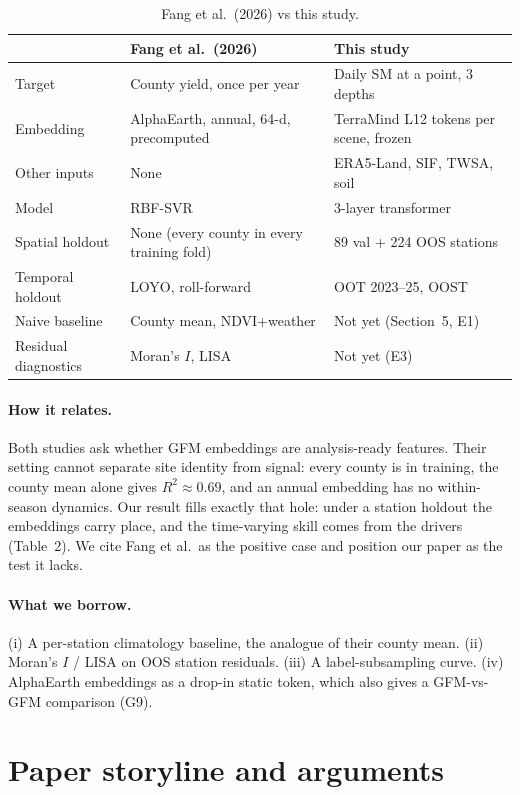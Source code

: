 \documentclass[11pt,a4paper]{article}
\begin{document}
\begin{table}[h]
\centering\small
\caption{Fang et al.\ (2026) vs this study.}
\begin{tabularx}{\linewidth}{@{}l Y Y@{}}
\toprule
 & Fang et al.\ (2026) & This study \\
\midrule
Target & County yield, once per year & Daily SM at a point, 3 depths \\
Embedding & AlphaEarth, annual, 64-d, precomputed & TerraMind L12 tokens per scene, frozen \\
Other inputs & None & ERA5-Land, SIF, TWSA, soil \\
Model & RBF-SVR & 3-layer transformer \\
Spatial holdout & None (every county in every training fold) & 89 val + 224 OOS stations \\
Temporal holdout & LOYO, roll-forward & OOT 2023--25, OOST \\
Naive baseline & County mean, NDVI+weather & Not yet (Section~5, E1) \\
Residual diagnostics & Moran's $I$, LISA & Not yet (E3) \\
\bottomrule
\end{tabularx}
\end{table}

\paragraph{How it relates.} Both studies ask whether GFM embeddings are analysis-ready features.
Their setting cannot separate site identity from signal: every county is in training, the county
mean alone gives $R^2\approx0.69$, and an annual embedding has no within-season dynamics. Our
result fills exactly that hole: under a station holdout the embeddings carry place, and the
time-varying skill comes from the drivers (Table~2). We cite Fang et al.\ as the positive case and
position our paper as the test it lacks.

\paragraph{What we borrow.} (i) A per-station climatology baseline, the analogue of their county
mean. (ii) Moran's $I$ / LISA on OOS station residuals. (iii) A label-subsampling curve. (iv)
AlphaEarth embeddings as a drop-in static token, which also gives a GFM-vs-GFM comparison (G9).

\section{Paper storyline and arguments}
\end{document}
